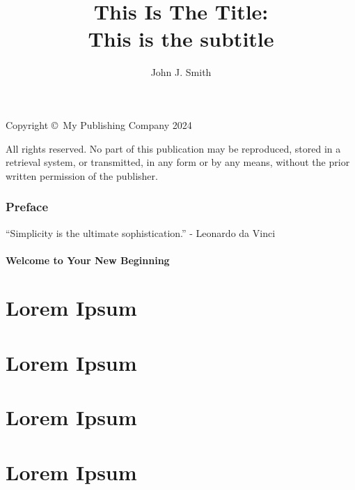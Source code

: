 \documentclass[openany,twopage,11pt]{book}
\title{This Is The Title: \\
    	This is the subtitle}
\author{John J. Smith}
\date{}
\begin{document}
	
	\maketitle
	\clearpage
	
	\begin{center}
		\vspace*{\fill}
		\thispagestyle{empty}
		
		Copyright \copyright~My Publishing Company 2024
		
		All rights reserved. No part of this publication may be reproduced, stored in a retrieval system, or transmitted, in any form or by any means, without the prior written permission of the publisher.
		\clearpage
	\end{center}
	
	\tableofcontents
	\newpage
	
	\subsection{Preface}\label{preface}
	
	``Simplicity is the ultimate sophistication.'' - Leonardo da Vinci
	
	\subsubsection{Welcome to Your New Beginning}\label{welcome-to-your-new-beginning}
	
	\lipsum[4-6]
	
	\chapter{Lorem Ipsum}\label{chapter-1}
	
	\lipsum[4-6]
	
	\chapter{Lorem Ipsum}\label{chapter-1}

	\lipsum[4-6]

	\chapter{Lorem Ipsum}\label{chapter-1}

	\lipsum[4-6]

	\chapter{Lorem Ipsum}\label{chapter-1}

	\lipsum[4-6]
\end{document}
